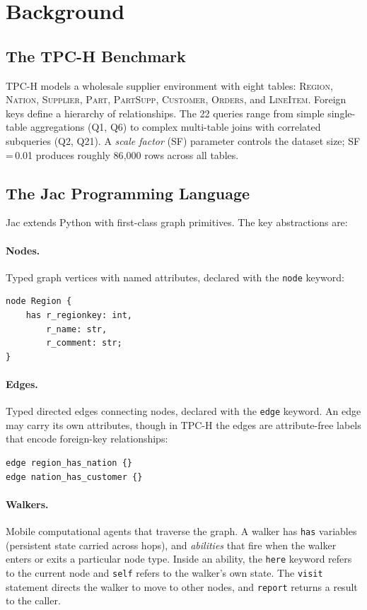\documentclass[11pt]{article}
\begin{document}
\section{Background}

\subsection{The TPC-H Benchmark}

TPC-H models a wholesale supplier environment with eight tables:
\textsc{Region}, \textsc{Nation}, \textsc{Supplier}, \textsc{Part},
\textsc{PartSupp}, \textsc{Customer}, \textsc{Orders}, and
\textsc{LineItem}.
Foreign keys define a hierarchy of relationships.
The 22 queries range from simple single-table aggregations (Q1, Q6) to
complex multi-table joins with correlated subqueries (Q2, Q21).
A \emph{scale factor} (SF) parameter controls the dataset size;
SF\,=\,0.01 produces roughly 86{,}000 rows across all tables.

\subsection{The Jac Programming Language}

Jac extends Python with first-class graph primitives.
The key abstractions are:

\paragraph{Nodes.}
Typed graph vertices with named attributes, declared with the \lstinline|node|
keyword:
\begin{lstlisting}
node Region {
    has r_regionkey: int,
        r_name: str,
        r_comment: str;
}
\end{lstlisting}

\paragraph{Edges.}
Typed directed edges connecting nodes, declared with the \lstinline|edge|
keyword.
An edge may carry its own attributes, though in TPC-H the edges are
attribute-free labels that encode foreign-key relationships:
\begin{lstlisting}
edge region_has_nation {}
edge nation_has_customer {}
\end{lstlisting}

\paragraph{Walkers.}
Mobile computational agents that traverse the graph.
A walker has \lstinline|has| variables (persistent state carried across hops),
and \emph{abilities} that fire when the walker enters or exits a particular
node type.
Inside an ability, the \lstinline|here| keyword refers to the current node
and \lstinline|self| refers to the walker's own state.
The \lstinline|visit| statement directs the walker to move to other nodes,
and \lstinline|report| returns a result to the caller.
\end{document}
